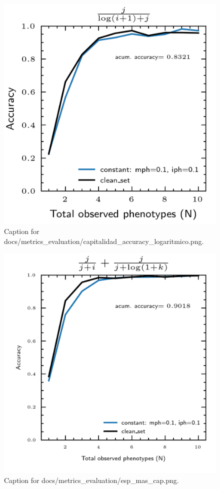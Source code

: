 \documentclass{article}
\begin{document}
\begin{figure}[h] \centering \includegraphics{docs/metrics_evaluation/capitalidad_accuracy_logaritmico.png} \caption{Caption for docs/metrics_evaluation/capitalidad_accuracy_logaritmico.png.} \end{figure}
\begin{figure}[h] \centering \includegraphics{docs/metrics_evaluation/esp_mas_cap.png} \caption{Caption for docs/metrics_evaluation/esp_mas_cap.png.} \end{figure}
\end{document}

